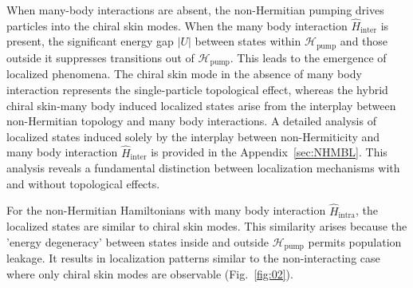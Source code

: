\documentclass[longbibliography, aps, prx, amsmath, amssymb, amsfonts, twocolumn,superscriptaddress, footinbib]{revtex4-1}
\begin{document}
	When many-body interactions are absent, the non-Hermitian pumping drives particles into the chiral skin modes. 
	When the many body interaction $\hat{H}_{\text{inter}}$ is present, the significant energy gap $\vert U \vert$ between states within $\mathscr{H}_{\text{pump}}$ and those outside it suppresses transitions out of $\mathscr{H}_{\text{pump}}$. This leads to the emergence of localized phenomena. 
	The chiral skin mode in the absence of many body interaction represents the single-particle topological effect, whereas the hybrid chiral skin-many body induced localized states arise from the interplay between non-Hermitian topology and many body interactions. A detailed analysis of localized states induced solely by the interplay between non-Hermiticity and many body interaction $\hat{H}_{\text{inter}}$ is provided in the Appendix~\ref{sec:NHMBL}.
	This analysis reveals a fundamental distinction between localization mechanisms with and without topological effects.

	For the non-Hermitian Hamiltonians with many body interaction $\hat{H}_{\text{intra}}$, the localized states are similar to chiral skin modes. 
	This similarity arises because the 'energy degeneracy' between states inside and outside $\mathscr{H}_{\text{pump}}$ permits population leakage. It results in localization patterns similar to the non-interacting case where only chiral skin modes are observable (Fig.~\ref{fig:02}).


\end{document}
